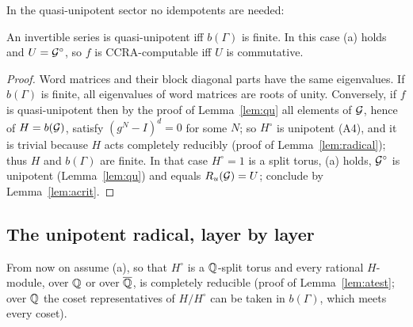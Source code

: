 In the quasi-unipotent sector no idempotents are needed:

\begin{lemma}\label{lem:qutest}
An invertible series is quasi-unipotent iff $b(\Gamma)$ is finite. In this case (a) holds and
$U=\mathcal{G}^\circ$, so $f$ is CCRA-computable iff $U$ is commutative.
\end{lemma}
\begin{proof}
Word matrices and their block diagonal parts have the same eigenvalues. If $b(\Gamma)$ is finite, all
eigenvalues of word matrices are roots of unity. Conversely, if $f$ is quasi-unipotent then by the
proof of Lemma~\ref{lem:qu} all elements of $\mathcal{G}$, hence of $H=b(\mathcal{G})$, satisfy $(g^N-I)^d=0$ for
some $N$; so $H^\circ$ is unipotent (A4), and it is trivial because $H$ acts completely reducibly
(proof of Lemma~\ref{lem:radical}); thus $H$ and $b(\Gamma)$ are finite. In that case $H^\circ=1$
is a split torus, (a) holds, $\mathcal{G}^\circ$ is unipotent (Lemma~\ref{lem:qu}) and equals
$R_u(\mathcal{G})=U$; conclude by Lemma~\ref{lem:acrit}.
\end{proof}

\subsection{The unipotent radical, layer by layer}\label{ssec:layers}
From now on assume (a), so that $H^\circ$ is a $\mathbb{Q}$-split torus and every rational $H$-module, over $\mathbb{Q}$
or over $\overline{\mathbb{Q}}$, is completely reducible (proof of Lemma~\ref{lem:atest}; over $\mathbb{Q}$ the coset
representatives of $H/H^\circ$ can be taken in $b(\Gamma)$, which meets every coset).

